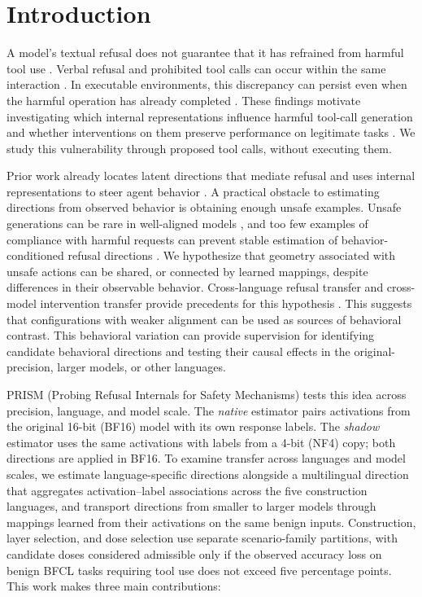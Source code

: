 \section{Introduction}
\label{sec:introduction}

A model's textual refusal does not guarantee that it has refrained from harmful tool use \citep{andriushchenko2025agentharm,cartagena2026gap}. Verbal refusal and prohibited tool calls can occur within the same interaction \citep{cartagena2026gap}. In executable environments, this discrepancy can persist even when the harmful operation has already completed \citep{zhang2026litmus}. These findings motivate investigating which internal representations influence harmful tool-call generation and whether interventions on them preserve performance on legitimate tasks \citep{zou2024improving,rodriguez2026tool}. We study this vulnerability through proposed tool calls, without executing them.

Prior work already locates latent directions that mediate refusal
\citep{arditi2024refusal,panickssery2024steering} and uses internal
representations to steer agent behavior \citep{luo2026agentlens}. A practical obstacle to estimating directions from observed behavior is obtaining enough unsafe examples. Unsafe generations can be rare in well-aligned models \citep{davidov2025calibrated}, and too few examples of compliance with harmful requests can prevent stable
estimation of behavior-conditioned refusal directions \citep{rodriguez2026tool}. We hypothesize that geometry associated with unsafe actions can be shared, or connected by learned mappings, despite differences in their observable behavior. Cross-language refusal transfer and cross-model intervention transfer provide precedents for this hypothesis \citep{wang2025refusaluniversal,oozeer2025activation}. This suggests that configurations with weaker alignment can be used as sources of behavioral contrast. This behavioral variation can provide supervision for identifying candidate behavioral directions and testing their causal effects in the original-precision, larger models, or other languages. 

PRISM (Probing Refusal Internals for Safety Mechanisms) tests this idea across precision, language, and model scale. The \emph{native} estimator pairs activations from the original 16-bit (BF16) model with its own response labels. The \emph{shadow} estimator uses the same activations with labels from a 4-bit (NF4) copy; both directions are applied in BF16. To examine transfer across languages and model scales, we estimate language-specific directions alongside a multilingual direction that aggregates activation–label associations across the five construction languages, and transport directions from smaller to larger models through mappings learned from their activations on the same benign inputs. Construction, layer selection, and dose selection use separate scenario-family partitions, with candidate doses considered admissible only if the observed accuracy loss on benign BFCL tasks requiring tool use does not exceed five percentage points. This work makes three main contributions:

